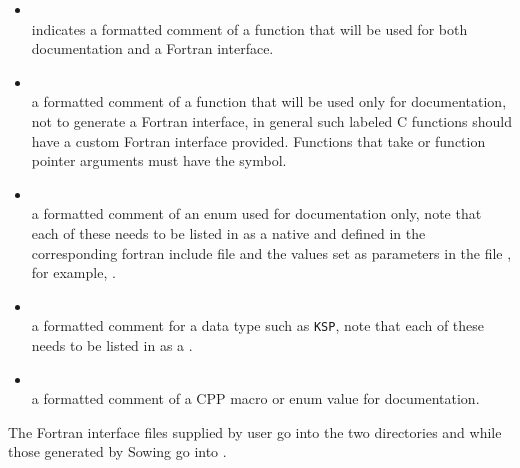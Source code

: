 \begin{itemize}
    \item
      \\      indicates a formatted comment of a function that will be used for
        both documentation and a Fortran interface.
    \item
      \\    a formatted comment of a function that will be used only for
        documentation, not to generate a Fortran interface, in general such labeled C functions should have a custom Fortran interface provided. Functions that take  or function pointer arguments must have the  symbol.
    \item
      \\     a formatted comment of an enum used for documentation only, note that
        each of these needs to be listed in  as
        a native and defined in the corresponding
         fortran include file and the values
        set as parameters in the file , for example, .
    \item
      \\     a formatted comment for a data type such as \lstinline{KSP}, note that each of these
        needs to be listed in  as a .
    \item
      \\    a formatted comment of a CPP macro or enum value for documentation.
\end{itemize}

The Fortran interface files supplied by user go into the two directories   and  while those generated by Sowing go into .

